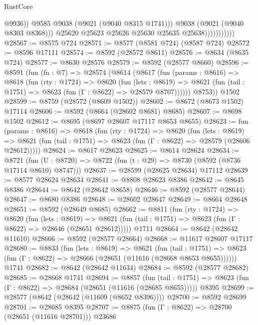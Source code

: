 \begin{lexlean}{RustCore}
\begin{coremodule}
                                  @9936))
                              @9585
                              @9038
                              (@9021 (@9040 @8315 @1741)))
                            @9038
                            (@9021 (@9040 @8303 @8368)))
                          @25620
                          @25623
                          @25626
                          @25630
                          @25635
                          @25638)))))))))))
@28567 := @8575 @724
@28571 := @8577 (@8581 @724) (@8587 @724)
@28572 := @8596 @17111
@28574 := @8592 (@28572 @8611)
@28576 := @8634 (@8635 @724)
@28577 := @8630 @28576
@28579 := @8592 (@28577 @8660)
@28596 := @8591
    (fun (fn : @7) =>
    @28574
      (@8614
        (@8617
          (fun (params : @8616) =>
          @8618
            (fun (rty : @1724) =>
            @8620
              (fun (lets : @8619) =>
              @8621 (fun (tail : @1751) => @8623 (fun (Γ : @8622) => @28579 @8707))))))
        @8753))
    @1502
@28599 := @8759 (@28572 (@8609 @1502))
@28602 := @8672 (@8673 @1502) @17114
@28606 := @8592 (@8664 (@28602 @8681) @8685)
@28607 := @8698 @1502
@28612 := @8695 (@8697 @28607 @17117 @8653 @8655)
@28623 := fun (params : @8616) =>
  @8618
    (fun (rty : @1724) =>
    @8620
      (fun (lets : @8619) =>
      @8621 (fun (tail : @1751) => @8623 (fun (Γ : @8622) => @28579 (@28606 @28612)))))
@28624 := @8617 @28623
@28625 := @8614 @28624
@28634 := @8721
    (fun (U : @8720) => @8722 (fun (t : @29) => @8730 (@8592 (@8736 @17114 @8610) @8747)))
@28637 := @28599 (@28625 @28634) @17112
@28639 := @8577 @28624 @28634
@28641 := @8808 @28623 @8386
@28642 := @8645 @8386
@28644 := @8642 (@28642 @8658)
@28646 := @8592 (@28577 @28644)
@28647 := @8680 @8386
@28648 := @28602 @28647
@28649 := @8664 @28648
@28651 := @8592 (@28649 @8685)
@28662 := @8811
    (fun (rty : @1724) =>
    @8620
      (fun (lets : @8619) =>
      @8621 (fun (tail : @1751) => @8623 (fun (Γ : @8622) => @28646 (@28651 @28612)))))
    @1711
@28664 := @8642 (@28642 @11610)
@28666 := @8592 (@28577 @28664)
@28668 := @11617 @28607 @17117
@28680 := @8833
    (fun (lets : @8619) =>
    @8621
      (fun (tail : @1751) =>
      @8623 (fun (Γ : @8622) => @28666 (@28651 (@11616 (@28668 @8653 @8655))))))
    @1741
@28682 := @8642 (@28642 @11634)
@28684 := @8592 (@28577 @28682)
@28685 := @28668 @1741
@28694 := @8857
    (fun (tail : @1751) => @8623 (fun (Γ : @8622) => @28684 (@28651 (@11616 (@28685 @8655)))))
    @8395
@28699 := @28577 (@8642 (@28642 (@11609 (@8652 @8396))))
@28700 := @8592 @28699
@28701 := @28685 @8395
@28707 := @8875 (fun (Γ : @8622) => @28700 (@28651 (@11616 @28701))) @23686

\end{coremodule}
\end{lexlean}
